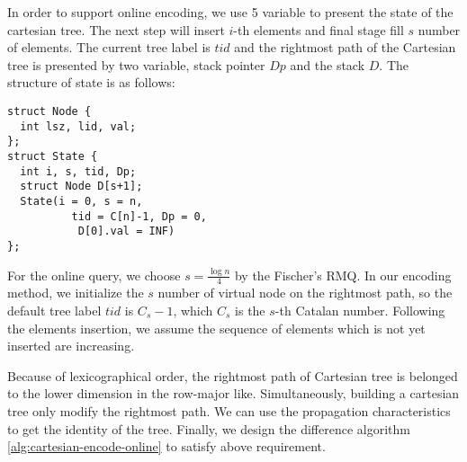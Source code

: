 \iffalse
根據先前的字典順序編碼，只需要維護笛卡爾樹的右鏈，實作上與堆疊結構相同。
基於 row-major 順序和遞迴定義 ~\ref{fun:LCA}，修改之前論文對於的離線編碼，
其對應方案如算法 \ref{alg:cartesian-encode-offline}。
\fi



In order to support online encoding, we use 5 variable to present the
state of the cartesian tree.  The next step will insert $i$-th
elements and final stage fill $s$ number of elements.  The current
tree label is $\mathit{tid}$ and the rightmost path of the Cartesian
tree is presented by two variable, stack pointer $\mathit{Dp}$ and the
stack $\mathit{D}$. The structure of state is as follows:

\iffalse
我們定義轉移狀態由 5 個變數來決定動態笛卡爾樹的編碼，當前插入第 $i$ 個元素，最終填充 $s$ 個元素，
當前的樹編號 $\mathit{tid}$，以及笛卡爾樹的右鏈狀態指針 $Dp$ 與其堆疊 $D$，其結構如下：
\fi

\begin{minipage}{0.9\linewidth}
\begin{lstlisting}[frame=single,caption=State of Cartesian Tree]
struct Node {
  int lsz, lid, val;
};
struct State {
  int i, s, tid, Dp;
  struct Node D[s+1];
  State(i = 0, s = n, 
          tid = C[n]-1, Dp = 0,
           D[0].val = INF)
};
\end{lstlisting}
\end{minipage}

For the online query, we choose $s=\frac{\log n}{4}$ by the Fischer's
RMQ.  In our encoding method, we initialize the $s$ number of virtual
node on the rightmost path, so the default tree label $\mathit{tid}$
is $C_s - 1$, which $C_s$ is the $s$-th Catalan number.  Following the
elements insertion, we assume the sequence of elements which is not
yet inserted are increasing.

Because of lexicographical order, the rightmost path of Cartesian tree
is belonged to the lower dimension in the row-major like.
Simultaneously, building a cartesian tree only modify the rightmost
path. We can use the propagation characteristics to get the identity
of the tree.  Finally, we design the difference algorithm
\ref{alg:cartesian-encode-online} to satisfy above requirement.

\iffalse
為了解決在線詢問操作，取 $s = \frac{\log n}{4}$。
根據字典順序的編碼性質，一開始建立虛設點 $s$ 個在右鏈上，其樹編號 $\mathit{tid} = C_s - 1$ 。
隨著插入元素的增加，尚未加入的元素都預設嚴格遞減，加上根據編碼順序，我們藉由差值來維護在線編碼 (如圖 ~\ref{fig:cartesianEncoding})。
根據上述的編碼想法，我們得到算法 ~\ref{alg:cartesian-encode-online}。
\fi

